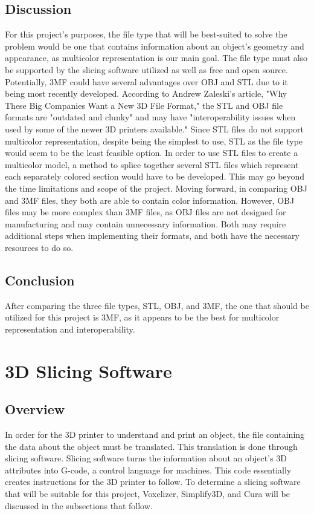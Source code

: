 \documentclass[letterpaper, onecolumn, draftclsnofoot,10pt, compsoc]{IEEEtran}
\begin{document}
\begin{singlespace}
\subsection{Discussion}
For this project's purposes, the file type that will be best-suited to solve the problem would be one that contains information about an object's geometry and appearance, as multicolor representation is our main goal.
The file type must also be supported by the slicing software utilized as well as free and open source.
Potentially, 3MF could have several advantages over OBJ and STL due to it being most recently developed.
According to Andrew Zaleski's article, "Why These Big Companies Want a New 3D File Format," the STL and OBJ file formats are "outdated and clunky" and may have "interoperability issues when used by some of the newer 3D printers available." \cite{newformatweb}
Since STL files do not support multicolor representation, despite being the simplest to use, STL as the file type would seem to be the least feasible option.
In order to use STL files to create a multicolor model, a method to splice together several STL files which represent each separately colored section would have to be developed. This may go beyond the time limitations and scope of the project. 
Moving forward, in comparing OBJ and 3MF files, they both are able to contain color information.
However, OBJ files may be more complex than 3MF files, as OBJ files are not designed for manufacturing and may contain unnecessary information. \cite{3mfweb}
Both may require additional steps when implementing their formats, and both have the necessary resources to do so.

\subsection{Conclusion}
After comparing the three file types, STL, OBJ, and 3MF, the one that should be utilized for this project is 3MF, as it appears to be the best for multicolor representation and interoperability. 

\section{3D Slicing Software}
\subsection{Overview}
In order for the 3D printer to understand and print an object, the file containing the data about the object must be translated.
This translation is done through slicing software.
Slicing software turns the information about an object's 3D attributes into G-code, a control language for machines. 
This code essentially creates instructions for the 3D printer to follow. \cite{whatisweb}
To determine a slicing software that will be suitable for this project, Voxelizer, Simplify3D, and Cura will be discussed in the subsections that follow. 


\end{singlespace}
\end{document}
